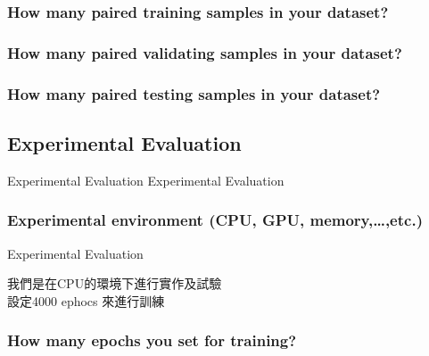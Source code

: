 \documentclass{beamer}
\begin{document}
\subsubsection{How many paired training samples in your dataset?}


\subsubsection{How many paired validating samples in your dataset?}


\subsubsection{How many paired testing samples in your dataset?}


\subsection{Experimental Evaluation }
\begin{frame}{Experimental Evaluation}
\center \huge Experimental Evaluation
\end{frame}

\subsubsection{Experimental environment (CPU, GPU, memory,…,etc.)}
\begin{frame}{Experimental Evaluation}
 \begin{CJK}{UTF8}{bkai}
我們是在CPU的環境下進行實作及試驗\\ \bigskip
設定4000 ephocs 來進行訓練
\end{CJK}
\end{frame}

\subsubsection{How many epochs you set for training?}
\end{document}
